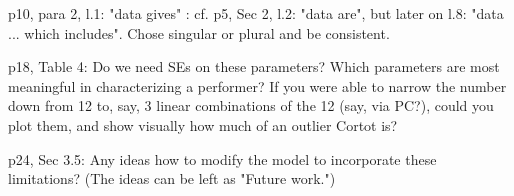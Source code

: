 p10, para 2, l.1: "data gives" : cf. p5, Sec 2, l.2: "data are", but 
later on l.8: "data ... which includes".  Chose singular or plural
and be consistent.


p18, Table 4: Do we need SEs on these parameters?  Which parameters are
most meaningful in characterizing a performer?  If you were able to narrow
the number down from 12 to, say, 3 linear combinations of the 12 (say, via
PC?), could you plot them, and show visually how much of an outlier Cortot is?

p24, Sec 3.5: Any ideas how to modify the model to incorporate these
limitations?  (The ideas can be left as "Future work.")




